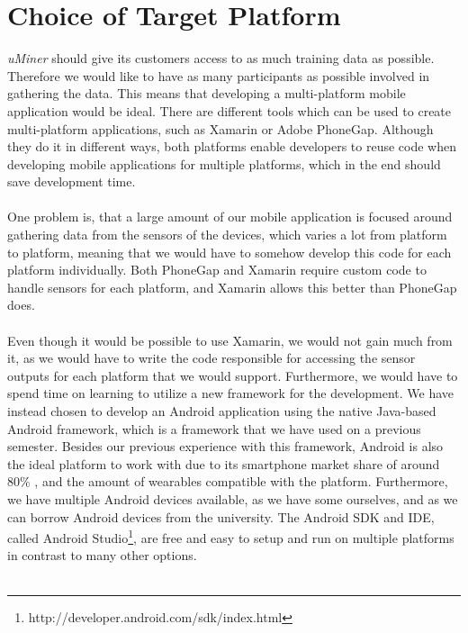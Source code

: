 
\section{Choice of Target Platform}
\label{sec:choice_of_platform}

\emph{uMiner} should give its customers access to as much training data as possible. Therefore we would like to have as many participants as possible involved in gathering the data. This means that developing a multi-platform mobile application would be ideal. There are different tools which can be used to create multi-platform applications, such as Xamarin or Adobe PhoneGap. Although they do it in different ways, both platforms enable developers to reuse code when developing mobile applications for multiple platforms, which in the end should save development time. 
\\\\
One problem is, that a large amount of our mobile application is focused around gathering data from the sensors of the devices, which varies a lot from platform to platform, meaning that we would have to somehow develop this code for each platform individually. Both PhoneGap and Xamarin require custom code to handle sensors for each platform, and Xamarin allows this better than PhoneGap does. 
\\\\
Even though it would be possible to use Xamarin, we would not gain much from it, as we would have to write the code responsible for accessing the sensor outputs for each platform that we would support. Furthermore, we would have to spend time on learning to utilize a new framework for the development. We have instead chosen to develop an Android application using the native Java-based Android framework, which is a framework that we have used on a previous semester. Besides our previous experience with this framework, Android is also the ideal platform to work with due to its smartphone market share of around 80\% \parencite{android_os_market_share}, and the amount of wearables compatible with the platform. Furthermore, we have multiple Android devices available, as we have some ourselves, and as we can borrow Android devices from the university. The Android SDK and IDE, called Android Studio\footnote{http://developer.android.com/sdk/index.html}, are free and easy to setup and run on multiple platforms in contrast to many other options.
\\\\
